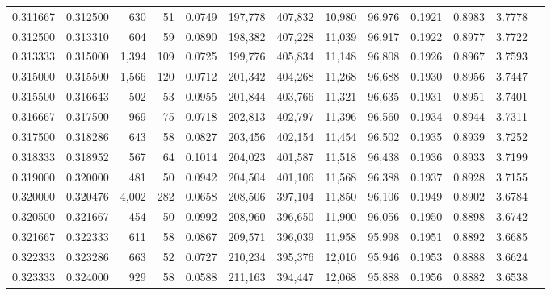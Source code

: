 \begin{tabular}{rrrrrrrrrrrrr}
0.311667 & 0.312500 &   630 &  51 &                                     0.0749 & 197,778 & 407,832 &  10,980 &  96,976 & 0.1921 & 0.8983 & 3.7778 \\
0.312500 & 0.313310 &   604 &  59 &                                     0.0890 & 198,382 & 407,228 &  11,039 &  96,917 & 0.1922 & 0.8977 & 3.7722 \\
0.313333 & 0.315000 & 1,394 & 109 &                                     0.0725 & 199,776 & 405,834 &  11,148 &  96,808 & 0.1926 & 0.8967 & 3.7593 \\
0.315000 & 0.315500 & 1,566 & 120 &                                     0.0712 & 201,342 & 404,268 &  11,268 &  96,688 & 0.1930 & 0.8956 & 3.7447 \\
0.315500 & 0.316643 &   502 &  53 &                                     0.0955 & 201,844 & 403,766 &  11,321 &  96,635 & 0.1931 & 0.8951 & 3.7401 \\
0.316667 & 0.317500 &   969 &  75 &                                     0.0718 & 202,813 & 402,797 &  11,396 &  96,560 & 0.1934 & 0.8944 & 3.7311 \\
0.317500 & 0.318286 &   643 &  58 &                                     0.0827 & 203,456 & 402,154 &  11,454 &  96,502 & 0.1935 & 0.8939 & 3.7252 \\
0.318333 & 0.318952 &   567 &  64 &                                     0.1014 & 204,023 & 401,587 &  11,518 &  96,438 & 0.1936 & 0.8933 & 3.7199 \\
0.319000 & 0.320000 &   481 &  50 &                                     0.0942 & 204,504 & 401,106 &  11,568 &  96,388 & 0.1937 & 0.8928 & 3.7155 \\
0.320000 & 0.320476 & 4,002 & 282 &                                     0.0658 & 208,506 & 397,104 &  11,850 &  96,106 & 0.1949 & 0.8902 & 3.6784 \\
0.320500 & 0.321667 &   454 &  50 &                                     0.0992 & 208,960 & 396,650 &  11,900 &  96,056 & 0.1950 & 0.8898 & 3.6742 \\
0.321667 & 0.322333 &   611 &  58 &                                     0.0867 & 209,571 & 396,039 &  11,958 &  95,998 & 0.1951 & 0.8892 & 3.6685 \\
0.322333 & 0.323286 &   663 &  52 &                                     0.0727 & 210,234 & 395,376 &  12,010 &  95,946 & 0.1953 & 0.8888 & 3.6624 \\
0.323333 & 0.324000 &   929 &  58 &                                     0.0588 & 211,163 & 394,447 &  12,068 &  95,888 & 0.1956 & 0.8882 & 3.6538 \\

\end{tabular}
